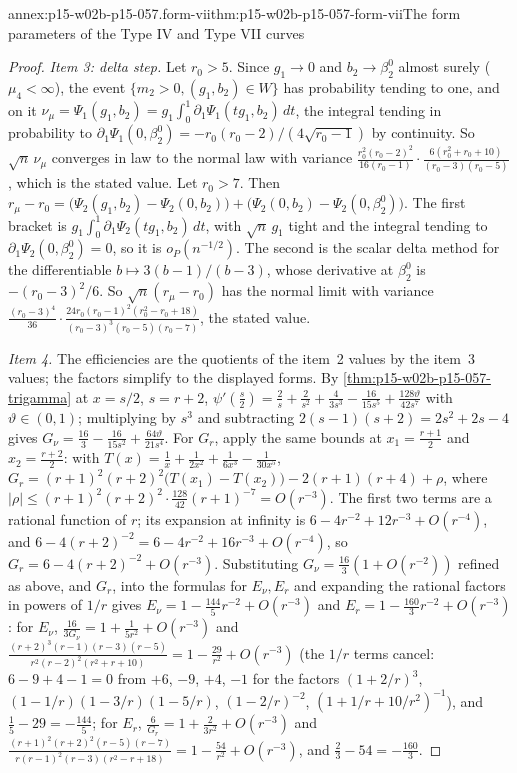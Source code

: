 \begin{annexitem}{annex:p15-w02b-p15-057.form-vii}{thm:p15-w02b-p15-057-form-vii}{The form parameters of the Type IV and Type VII curves}
\begin{proof}
\emph{Item 3: delta step.} Let \(r_0>5\). Since \(g_1\to0\) and
\(b_2\to\beta_2^0\) almost surely (\(\mu_4<\infty\)), the event
\(\{m_2>0,(g_1,b_2)\in W\}\) has probability tending to one, and on it
\(\nu_\mu=\Psi_1(g_1,b_2)=g_1\int_0^1\partial_1\Psi_1(tg_1,b_2)\,dt\), the
integral tending in probability to \(\partial_1\Psi_1(0,\beta_2^0)
=-r_0(r_0-2)/(4\sqrt{r_0-1})\) by continuity. So \(\sqrt n\,\nu_\mu\)
converges in law to the normal law with variance
\(\frac{r_0^2(r_0-2)^2}{16(r_0-1)}\cdot\frac{6(r_0^2+r_0+10)}{(r_0-3)(r_0-5)}\),
which is the stated value. Let \(r_0>7\). Then
\(r_\mu-r_0=\bigl(\Psi_2(g_1,b_2)-\Psi_2(0,b_2)\bigr)
+\bigl(\Psi_2(0,b_2)-\Psi_2(0,\beta_2^0)\bigr)\). The first bracket is
\(g_1\int_0^1\partial_1\Psi_2(tg_1,b_2)\,dt\), with \(\sqrt n\,g_1\) tight
and the integral tending to \(\partial_1\Psi_2(0,\beta_2^0)=0\), so it is
\(o_P(n^{-1/2})\). The second is the scalar delta method for the
differentiable \(b\mapsto3(b-1)/(b-3)\), whose derivative at \(\beta_2^0\)
is \(-(r_0-3)^2/6\). So \(\sqrt n(r_\mu-r_0)\) has the normal limit with
variance \(\frac{(r_0-3)^4}{36}\cdot\frac{24r_0(r_0-1)^2(r_0^2-r_0+18)}
{(r_0-3)^3(r_0-5)(r_0-7)}\), the stated value.

\emph{Item 4.} The efficiencies are the quotients of the item~2 values by
the item~3 values; the factors simplify to the displayed forms. By
\cref{thm:p15-w02b-p15-057-trigamma} at \(x=s/2\), \(s=r+2\),
\(\psi'(\frac s2)=\frac2s+\frac2{s^2}+\frac4{3s^3}-\frac{16}{15s^5}
+\frac{128\vartheta}{42s^7}\) with \(\vartheta\in(0,1)\); multiplying by
\(s^3\) and subtracting \(2(s-1)(s+2)=2s^2+2s-4\) gives
\(G_\nu=\frac{16}3-\frac{16}{15s^2}+\frac{64\vartheta}{21s^4}\). For \(G_r\),
apply the same bounds at \(x_1=\frac{r+1}2\) and \(x_2=\frac{r+2}2\): with
\(T(x)=\frac1x+\frac1{2x^2}+\frac1{6x^3}-\frac1{30x^5}\),
\(G_r=(r+1)^2(r+2)^2\bigl(T(x_1)-T(x_2)\bigr)-2(r+1)(r+4)+\rho\), where
\(|\rho|\leq(r+1)^2(r+2)^2\cdot\frac{128}{42}(r+1)^{-7}=O(r^{-3})\). The
first two terms are a rational function of \(r\); its expansion at
infinity is \(6-4r^{-2}+12r^{-3}+O(r^{-4})\), and
\(6-4(r+2)^{-2}=6-4r^{-2}+16r^{-3}+O(r^{-4})\), so
\(G_r=6-4(r+2)^{-2}+O(r^{-3})\). Substituting \(G_\nu=\frac{16}3
(1+O(r^{-2}))\) refined as above, and \(G_r\), into the formulas for
\(E_\nu,E_r\) and expanding the rational factors in powers of \(1/r\)
gives \(E_\nu=1-\frac{144}5r^{-2}+O(r^{-3})\) and
\(E_r=1-\frac{160}3r^{-2}+O(r^{-3})\): for \(E_\nu\),
\(\frac{16}{3G_\nu}=1+\frac1{5r^2}+O(r^{-3})\) and
\(\frac{(r+2)^3(r-1)(r-3)(r-5)}{r^2(r-2)^2(r^2+r+10)}
=1-\frac{29}{r^2}+O(r^{-3})\) (the \(1/r\) terms cancel: \(6-9+4-1=0\) from
\(+6\), \(-9\), \(+4\), \(-1\) for the factors \((1+2/r)^3\),
\((1-1/r)(1-3/r)(1-5/r)\), \((1-2/r)^{-2}\), \((1+1/r+10/r^2)^{-1}\)), and
\(\frac15-29=-\frac{144}5\); for \(E_r\), \(\frac6{G_r}=1+\frac2{3r^2}
+O(r^{-3})\) and \(\frac{(r+1)^2(r+2)^2(r-5)(r-7)}{r(r-1)^2(r-3)
(r^2-r+18)}=1-\frac{54}{r^2}+O(r^{-3})\), and \(\frac23-54
=-\frac{160}3\).
\end{proof}
\end{annexitem}

